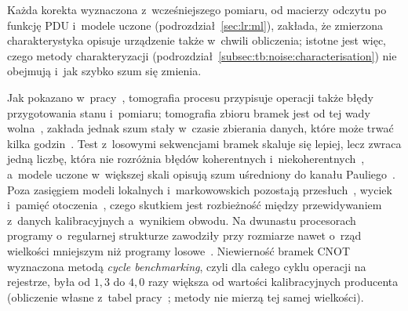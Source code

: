 Każda korekta wyznaczona z~wcześniejszego pomiaru, od macierzy odczytu po funkcję PDU i~modele uczone (podrozdział~\ref{sec:lr:ml}), zakłada, że zmierzona charakterystyka opisuje urządzenie także w~chwili obliczenia; istotne jest więc, czego metody charakteryzacji (podrozdział~\ref{subsec:tb:noise:characterisation}) nie obejmują i~jak szybko szum się zmienia.

Jak pokazano w~pracy~\cite{Merkel2013}, tomografia procesu przypisuje operacji także błędy przygotowania stanu i~pomiaru; tomografia zbioru bramek jest od tej wady wolna~\cite{BlumeKohout2017,bib:quantum_gate_tomography}, zakłada jednak szum stały w~czasie zbierania danych, które może trwać kilka godzin~\cite{hashim_practical_2025}.
Test z~losowymi sekwencjami bramek skaluje się lepiej, lecz zwraca jedną liczbę, która nie rozróżnia błędów koherentnych i~niekoherentnych~\cite{Magesan2011,ProctorWhat2017,Wallman2015,Hashim2023}, a~modele uczone w~większej skali opisują szum uśredniony do kanału Pauliego~\cite{harper_efficient_2020,van_den_berg_probabilistic_2023}.
Poza zasięgiem modeli lokalnych i~markowowskich pozostają przesłuch~\cite{sarovar_detecting_2020,mundada2019crosstalk}, wyciek~\cite{Wood2015} i~pamięć otoczenia~\cite{white_demonstration_2020}, czego skutkiem jest rozbieżność między przewidywaniem z~danych kalibracyjnych a~wynikiem obwodu.
Na dwunastu procesorach programy o~regularnej strukturze zawodziły przy rozmiarze nawet o~rząd wielkości mniejszym niż programy losowe~\cite{proctor_measuring_2022}.
Niewierność bramek CNOT wyznaczona metodą \emph{cycle benchmarking}, czyli dla całego cyklu operacji na rejestrze, była od $1{,}3$ do $4{,}0$ razy większa od wartości kalibracyjnych producenta (obliczenie własne z~tabel pracy~\cite{yeter-aydeniz_measuring_2023}; metody nie mierzą tej samej wielkości).

